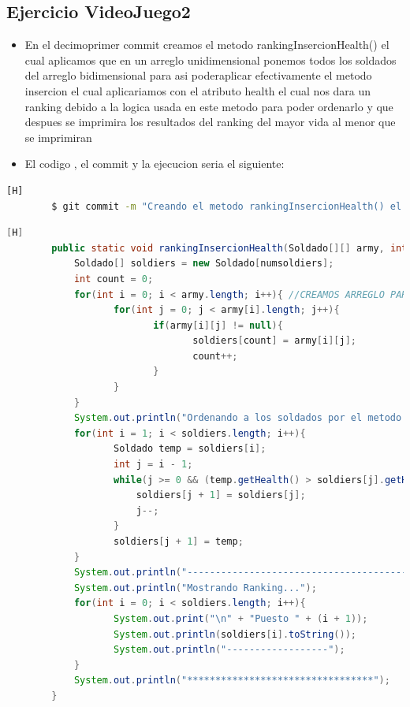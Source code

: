 \documentclass{article}
\begin{document}
	\subsection{Ejercicio VideoJuego2}
	\begin{itemize}	
		\item En el decimoprimer commit creamos el metodo rankingInsercionHealth() el cual aplicamos que en un arreglo unidimensional ponemos todos los soldados del arreglo bidimensional para asi poderaplicar efectivamente el metodo insercion el cual aplicariamos con el atributo health el cual nos dara un ranking debido a la logica usada en este metodo para poder ordenarlo y que despues se imprimira los resultados del ranking del mayor vida al menor que se imprimiran 
		\item El codigo , el commit y la ejecucion seria el siguiente:
	\end{itemize}	
	\begin{lstlisting}[language=bash,caption={Commit}][H]
		$ git commit -m "Creando el metodo rankingInsercionHealth() el cual tambien ordenaria nuestros soldados pero esto ya seria de manera de la forma insercion ya que el anterior fue burbuja en este aplicamos la logica para la insercion al igual que el otro tuvimos que poner a los soldados en un arreglo unidimensional para poder despues ordenarlos y imprimirlos en el debido puesto que deberian estar por su ranking de puntos"
	\end{lstlisting}	
	\begin{lstlisting}[language=java,caption={Las lineas de codigos del metodo creado:}][H]
		public static void rankingInsercionHealth(Soldado[][] army, int numsoldiers){
			Soldado[] soldiers = new Soldado[numsoldiers];
			int count = 0;
			for(int i = 0; i < army.length; i++){ //CREAMOS ARREGLO PARA QUE LOS SOLDADOS SE TRASLADEN DE UN ARREGLO BIDIMENSIONAL A UNO DIMENSIONAL PARA APLICAR EL METODO INSERCION
				   for(int j = 0; j < army[i].length; j++){
						  if(army[i][j] != null){
								 soldiers[count] = army[i][j];
								 count++;
						  }
				   }
			}
			System.out.println("Ordenando a los soldados por el metodo insercion: "); //APLICAMOS EL METODO INSERCION CON LOS PUNTOS DE VIDA
			for(int i = 1; i < soldiers.length; i++){
				   Soldado temp = soldiers[i];
				   int j = i - 1;
				   while(j >= 0 && (temp.getHealth() > soldiers[j].getHealth())){
					   soldiers[j + 1] = soldiers[j];
					   j--;
				   }
				   soldiers[j + 1] = temp;
			}
			System.out.println("------------------------------------------");
			System.out.println("Mostrando Ranking...");
			for(int i = 0; i < soldiers.length; i++){
				   System.out.print("\n" + "Puesto " + (i + 1));
				   System.out.println(soldiers[i].toString());
				   System.out.println("------------------");
			}
			System.out.println("*********************************");
	   	}
	\end{lstlisting}
\end{document}
